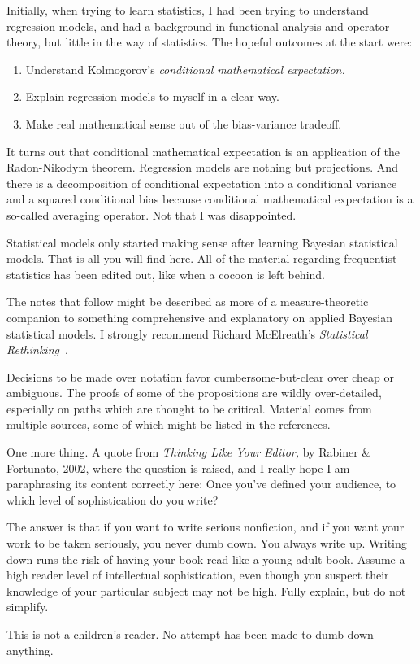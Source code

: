 \documentclass[
twoside=true,
paper=letter,
fontsize=11pt,
pagesize=auto,
leqno,
openany,
headsepline,
overfullrule,
]{scrbook}
\theoremstyle{plain}
\theoremstyle{plain}
\theoremstyle{definition}
\theoremstyle{bfnoteitalic}
\theoremstyle{bfnoteroman}
\begin{document}
Initially, when trying to learn statistics, I had been trying to understand regression models, and had a background in functional analysis and operator theory, but little in the way of statistics.
The hopeful outcomes at the start were:
\begin{enumerate}
\item
Understand Kolmogorov's \emph{conditional mathematical expectation.}
\item
Explain regression models to myself in a clear way.
\item
Make real mathematical sense out of the bias-variance tradeoff.
\end{enumerate}
It turns out that
conditional mathematical expectation is an application of the Radon-Nikodym theorem.
Regression models are nothing but projections.
And there is a decomposition of  conditional expectation into a conditional variance and a squared conditional bias because conditional mathematical expectation is a so-called averaging operator.
Not that I was disappointed.

Statistical models only started making sense after learning Bayesian statistical models.  That is all you will find here. All of the material regarding frequentist statistics has been edited out, like when a cocoon is left behind.

The notes that follow  might be described as more of a measure-theoretic companion to something  comprehensive and explanatory on applied Bayesian statistical models.  I strongly recommend Richard McElreath's \textsl{Statistical Rethinking}~\cite{sr_mcelreath_2020}.

Decisions to be made over notation favor cumbersome-but-clear over cheap or ambiguous.
The proofs of some of the propositions are wildly over-detailed, especially on paths which are thought to be critical.
Material comes from multiple sources, some of which might be listed in the references.


One more thing.
A quote from \textsl{Thinking Like Your Editor,} by Rabiner \& Fortunato, 2002, where the question is raised, and I really hope I am paraphrasing its content correctly here: Once you've defined your audience, to which level of sophistication do you write?
\begin{quoting}\small
The answer is that if you want to write serious nonfiction, and if you want your work to be taken seriously, you never dumb down. You always write up. Writing down runs the risk of having your book read like a young adult book. Assume a high reader level of intellectual sophistication, even though you suspect their knowledge of your particular subject may not be high.  Fully explain, but do not simplify.
\end{quoting}
This is not a children's reader.
No attempt has been made to dumb down anything.
\end{document}

